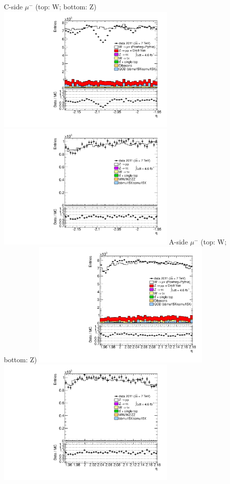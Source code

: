  {
\colb[T]
C-side $\mu^{-}$ (top: W; bottom: Z)
\centering
\includegraphics[width=0.66\textwidth]{dates/20130306/figures/etaphi/W_10_C_stack_l_eta_NEG} \\
\includegraphics[width=0.66\textwidth]{dates/20130306/figures/etaphi/Z_10_C_stack_lN_eta_ALL.pdf}
A-side $\mu^{-}$ (top: W; bottom: Z)
\centering
\includegraphics[width=0.66\textwidth]{dates/20130306/figures/etaphi/W_10_A_stack_l_eta_NEG} \\
\includegraphics[width=0.66\textwidth]{dates/20130306/figures/etaphi/Z_10_A_stack_lN_eta_ALL.pdf} 
\cole
}


